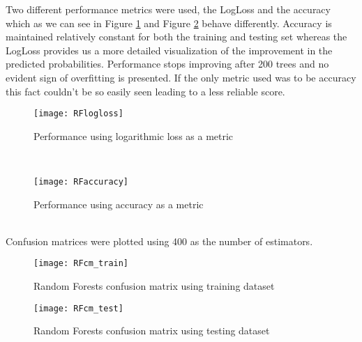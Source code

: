 Two different performance metrics were used, the LogLoss and the accuracy which as we can see in Figure \ref{fig:RFlog_loss} and Figure \ref{fig:RFaccuracy} behave differently. Accuracy is maintained relatively constant for both the training and testing set whereas the LogLoss provides us a more detailed visualization of the improvement in the predicted probabilities. Performance stops improving after 200 trees and no evident sign of overfitting is presented. If the only metric used was to be accuracy this fact couldn't be so easily seen leading to a less reliable score.\\
\begin{figure}[h!]
    \centering
    \texttt{[image: RFlogloss]}
    \caption{Performance using logarithmic loss as a metric}
    \label{fig:RFlog_loss}
\end{figure}\\
\begin{figure}[h!]
    \centering
    \texttt{[image: RFaccuracy]}
    \caption{Performance using accuracy as a metric}
    \label{fig:RFaccuracy}
\end{figure}\\
Confusion matrices were plotted using 400 as the number of estimators.
\begin{figure}[h!]
    \centering
    \texttt{[image: RFcm\_train]}
    \caption{Random Forests confusion matrix using training dataset}
    \label{fig:RFcm_train}
\end{figure}
\begin{figure}[h!]
    \centering
    \texttt{[image: RFcm\_test]}
    \caption{Random Forests confusion matrix using testing dataset}
    \label{fig:RFcm_test}
\end{figure}